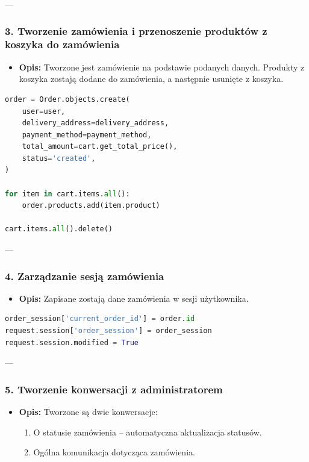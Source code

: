 \documentclass[12pt,a4paper,oneside]{article}
\theoremstyle{definition}
\numberwithin{equation}{section}
\begin{document}
---

\subsubsection*{3. Tworzenie zamówienia i przenoszenie produktów z koszyka do zamówienia}
\begin{itemize}
    \item \textbf{Opis:} Tworzone jest zamówienie na podstawie podanych danych. Produkty z koszyka zostają dodane do zamówienia, a następnie usunięte z koszyka.
\end{itemize}

\begin{lstlisting}[language=Python]
order = Order.objects.create(
    user=user,
    delivery_address=delivery_address,
    payment_method=payment_method,
    total_amount=cart.get_total_price(),
    status='created',
)

for item in cart.items.all():
    order.products.add(item.product)

cart.items.all().delete()
\end{lstlisting}

---

\subsubsection*{4. Zarządzanie sesją zamówienia}
\begin{itemize}
    \item \textbf{Opis:} Zapisane zostają dane zamówienia w sesji użytkownika.
\end{itemize}

\begin{lstlisting}[language=Python]
order_session['current_order_id'] = order.id
request.session['order_session'] = order_session
request.session.modified = True
\end{lstlisting}

---

\subsubsection*{5. Tworzenie konwersacji z administratorem}
\begin{itemize}
    \item \textbf{Opis:} Tworzone są dwie konwersacje:
    \begin{enumerate}
        \item O statusie zamówienia – automatyczna aktualizacja statusów.
        \item Ogólna komunikacja dotycząca zamówienia.
    \end{enumerate}
\end{itemize}
\end{document}
